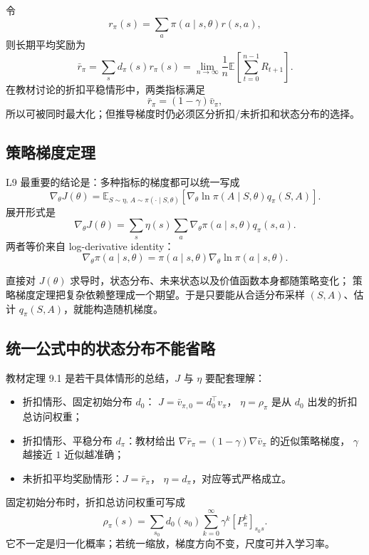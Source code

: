 \documentclass[11pt,a4paper,fontset=fandol]{ctexart}
\newcommand{\E}{\mathbb{E}}
\begin{document}
令
\[
r_\pi(s)=\sum_a\pi(a\mid s,\theta)r(s,a),
\]
则长期平均奖励为
\[
\boxed{
\bar r_\pi
=\sum_s d_\pi(s)r_\pi(s)
=\lim_{n\to\infty}\frac1n
\E\!\left[\sum_{t=0}^{n-1}R_{t+1}\right]}.
\]
在教材讨论的折扣平稳情形中，两类指标满足
\[
\bar r_\pi=(1-\gamma)\bar v_\pi,
\]
所以可被同时最大化；但推导梯度时仍必须区分折扣/未折扣和状态分布的选择。

\subsection{策略梯度定理}

L9 最重要的结论是：多种指标的梯度都可以统一写成
\[
\boxed{
\nabla_\theta J(\theta)
=\E_{S\sim\eta,\,A\sim\pi(\cdot\mid S,\theta)}
\left[
\nabla_\theta\ln\pi(A\mid S,\theta)q_\pi(S,A)
\right]}.
\]
展开形式是
\[
\nabla_\theta J(\theta)
=\sum_s\eta(s)\sum_a
\nabla_\theta\pi(a\mid s,\theta)q_\pi(s,a).
\]
两者等价来自 log-derivative identity：
\[
\nabla_\theta\pi(a\mid s,\theta)
=\pi(a\mid s,\theta)
\nabla_\theta\ln\pi(a\mid s,\theta).
\]

\begin{intuitionbox}[为什么这个定理如此关键]
直接对 \(J(\theta)\) 求导时，状态分布、未来状态以及价值函数本身都随策略变化；
策略梯度定理把复杂依赖整理成一个期望。于是只要能从合适分布采样
\((S,A)\)、估计 \(q_\pi(S,A)\)，就能构造随机梯度。
\end{intuitionbox}

\subsection{统一公式中的状态分布不能省略}

教材定理 9.1 是若干具体情形的总结，\(J\) 与 \(\eta\) 要配套理解：

\begin{itemize}
  \item 折扣情形、固定初始分布 \(d_0\)：
  \(J=\bar v_{\pi,0}=d_0^\top v_\pi\)，
  \(\eta=\rho_\pi\) 是从 \(d_0\) 出发的折扣总访问权重；
  \item 折扣情形、平稳分布 \(d_\pi\)：教材给出
  \(\nabla\bar r_\pi=(1-\gamma)\nabla\bar v_\pi\) 的近似策略梯度，
  \(\gamma\) 越接近 \(1\) 近似越准确；
  \item 未折扣平均奖励情形：\(J=\bar r_\pi\)，
  \(\eta=d_\pi\)，对应等式严格成立。
\end{itemize}

固定初始分布时，折扣总访问权重可写成
\[
\rho_\pi(s)
=\sum_{s_0}d_0(s_0)
\sum_{k=0}^{\infty}\gamma^k[P_\pi^k]_{s_0s}.
\]
它不一定是归一化概率；若统一缩放，梯度方向不变，尺度可并入学习率。
\end{document}
